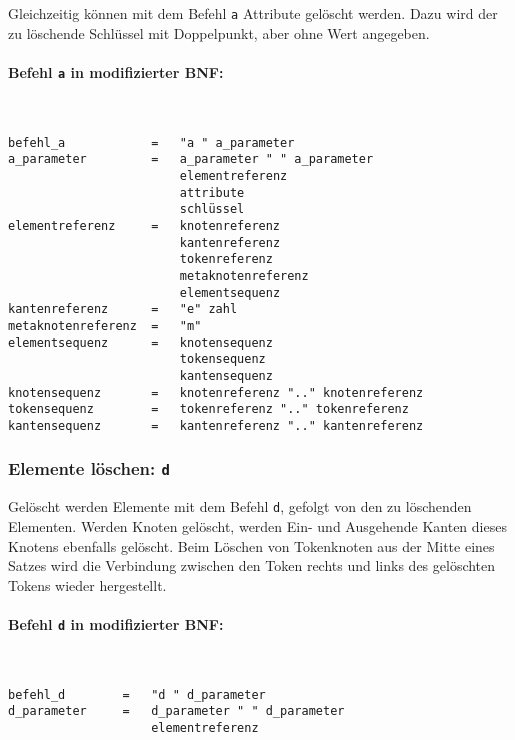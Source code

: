 \documentclass[12pt]{scrartcl}
\begin{document}
Gleichzeitig können mit dem Befehl \texttt{a} Attribute gelöscht werden. Dazu wird der zu löschende Schlüssel mit Doppelpunkt, aber ohne Wert angegeben.

\paragraph*{Befehl \texttt{a} in modifizierter BNF:}
~
\begin{framed}
\begin{lstlisting}
befehl_a            =   "a " a_parameter
a_parameter         =   a_parameter " " a_parameter
                        elementreferenz
                        attribute
                        schlüssel
elementreferenz     =   knotenreferenz
                        kantenreferenz
                        tokenreferenz
                        metaknotenreferenz
                        elementsequenz
kantenreferenz      =   "e" zahl
metaknotenreferenz  =   "m"
elementsequenz      =   knotensequenz
                        tokensequenz
                        kantensequenz
knotensequenz       =   knotenreferenz ".." knotenreferenz
tokensequenz        =   tokenreferenz ".." tokenreferenz
kantensequenz       =   kantenreferenz ".." kantenreferenz
\end{lstlisting}
\end{framed}




\subsubsection{Elemente löschen: \texttt{d}}

Gelöscht werden Elemente mit dem Befehl \texttt{d}, gefolgt von den zu löschenden Elementen. Werden Knoten gelöscht, werden Ein- und Ausgehende Kanten dieses Knotens ebenfalls gelöscht. Beim Löschen von Tokenknoten aus der Mitte eines Satzes wird die Verbindung zwischen den Token rechts und links des gelöschten Tokens wieder hergestellt.
\paragraph*{Befehl \texttt{d} in modifizierter BNF:}
~
\begin{framed}
\begin{lstlisting}
befehl_d        =   "d " d_parameter
d_parameter     =   d_parameter " " d_parameter
                    elementreferenz
\end{lstlisting}
\end{framed}
\end{document}
